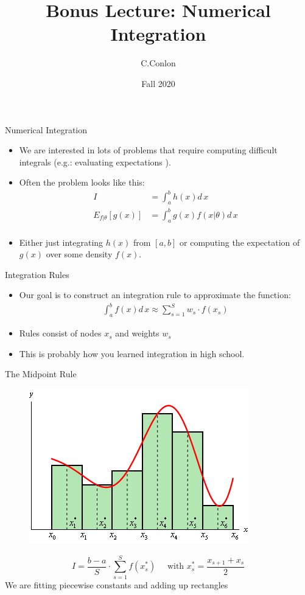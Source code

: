 \documentclass[xcolor=pdftex,dvipsnames,table,mathserif,aspectratio=169]{beamer}
\title{Bonus Lecture: Numerical Integration}
\author{C.Conlon}
\date{Fall 2020}
\begin{document}
\frame{\titlepage}

\begin{frame}{Numerical Integration}
\begin{itemize}
\item  We are interested in lots of problems that require computing difficult integrals (e.g.: evaluating expectations ).\\
\item Often the problem looks like this:
\begin{align*}
I &= \int_{a}^b h(x) d\,x\\
E_{f| \theta}[g(x)] &= \int_{a}^b g(x) f(x | \theta) d\,x\\
\end{align*}
\item Either just integrating $h(x)$ from $[a,b]$ or computing the expectation of $g(x)$ over some density $f(x)$.
\end{itemize}
\end{frame}


\begin{frame}{Integration Rules}

\begin{itemize}
\item Our goal is to construct an \alert{integration rule} to approximate the function:
\begin{align*}
\int_{a}^{b} f(x) d\, x \approx \sum_{s=1}^S w_s \cdot f(x_s)
\end{align*}
\item Rules consist of \alert{nodes} $x_s$ and \alert{weights} $w_s$
\item This is probably how you learned integration in high school.
\end{itemize}
\end{frame}


\begin{frame}{The Midpoint Rule}
\begin{figure}[htbp]
\begin{center}
\includegraphics[height=0.65\textheight]{./resources/midpoint.png}
\end{center}
\end{figure}
$$ I = \frac{b-a}{S} \cdot \sum_{s=1}^S f(x_s^{*}) \quad \text{ with }  x_s^{*} = \frac{x_{s+1} + x_{s}}{2}$$
We are fitting \alert{piecewise constants} and adding up \alert{rectangles}
\end{frame}
\end{document}
